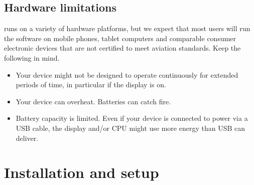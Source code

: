 \documentclass[letterpaper,10pt,english]{sphinxmanual}
\begin{document}
\section{Hardware limitations}
\label{\detokenize{01-intro/01-think:hardware-limitations}}
\sphinxAtStartPar
{} runs on a variety of hardware platforms, but we
expect that most users will run the software on mobile phones, tablet computers
and comparable consumer electronic devices that are not certified to meet
aviation standards.  Keep the following in mind.
\begin{itemize}
\item {} 
\sphinxAtStartPar
Your device might not be designed to operate continuously for extended periods
of time, in particular if the display is on.

\item {} 
\sphinxAtStartPar
Your device can overheat. Batteries can catch fire.

\item {} 
\sphinxAtStartPar
Battery capacity is limited.  Even if your device is connected to power via a
USB cable, the display and/or CPU might use more energy than USB can deliver.

\end{itemize}


\chapter{Installation and setup}
\label{\detokenize{01-intro/02-installation:installation-and-setup}}\label{\detokenize{01-intro/02-installation::doc}}
\end{document}

